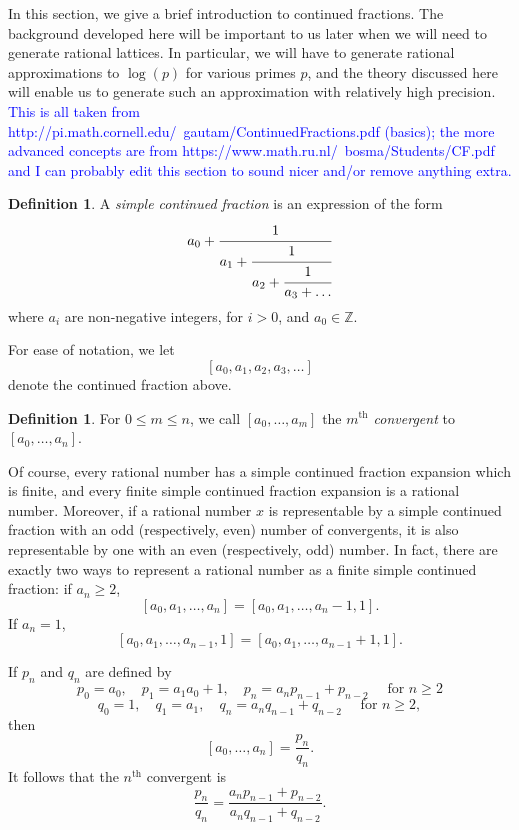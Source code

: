 \documentclass[11pt]{report}
\theoremstyle{definition}
\newtheorem{definition}[theorem]{Definition}
\newcommand{\edit}[1]{\textcolor{blue}{#1}}
\begin{document}
In this section, we give a brief introduction to continued fractions. The background developed here will be important to us later when we will need to generate rational lattices. In particular, we will have to generate rational approximations to $\log(p)$ for various primes $p$, and the theory discussed here will enable us to generate such an approximation with relatively high precision. \edit{This is all taken from http://pi.math.cornell.edu/~gautam/ContinuedFractions.pdf (basics); the more advanced concepts are from https://www.math.ru.nl/~bosma/Students/CF.pdf and I can probably edit this section to sound nicer and/or remove anything extra.}

\begin{definition}
  A \textit{simple continued fraction} is an expression of the form
  \[a_0 + \cfrac{1}{a_1 + \cfrac{1}{a_2 + \cfrac{1}{a_3 + \dots}}}\]
  where $a_i$ are non-negative integers, for $i > 0$, and $a_0 \in \mathbb{Z}$.
\end{definition}
For ease of notation, we let
\[ [a_0,a_1,a_2,a_3,\dots] \]
denote the continued fraction above.
\begin{definition}
  For $0 \leq m \leq n$, we call $[a_0, \dots, a_m]$ the \textit{$m^{\text{th}}$ convergent} to $[a_0,\dots, a_n]$.
\end{definition}

Of course, every rational number has a simple continued fraction expansion which is finite, and every finite simple continued fraction expansion is a rational number. Moreover, if a rational number $x$ is representable by a simple continued fraction with an odd (respectively, even) number of convergents, it is also representable by one with an even (respectively, odd) number. In fact, there are exactly two ways to represent a rational number as a finite simple continued fraction: if $a_n\geq2$,
\[ [a_0,a_1,\dots,a_n] = [a_0,a_1,\dots,a_n - 1,1]. \]
If $a_n = 1$,
\[ [a_0,a_1,\dots,a_{n-1},1] = [a_0,a_1,\dots,a_{n-1} + 1,1].\]

If $p_n$ and $q_n$ are defined by
\[p_0 = a_0, \quad p_1 = a_1a_0 + 1, \quad p_n = a_np_{n-1} + p_{n-2} \quad \text{ for } n\geq 2\]
\[q_0 = 1, \quad q_1 = a_1, \quad q_n = a_nq_{n-1} + q_{n-2} \quad \text{ for } n\geq 2,\]
then
\[ [a_0,\dots,a_n] = \frac{p_n}{q_n}.\]
It follows that the $n^{\text{th}}$ convergent is
\[\frac{p_n}{q_n} = \frac{a_np_{n-1} + p_{n-2}}{a_nq_{n-1} + q_{n-2}}.\]
\end{document}
